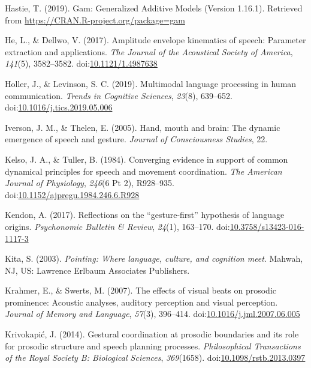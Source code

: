 \documentclass[
  man,floatsintext]{apa6}
\newlength{\cslhangindent}
\newenvironment{cslreferences}%
  {\setlength{\parindent}{0pt}%
  \everypar{\setlength{\hangindent}{\cslhangindent}}\ignorespaces}%
  {\par}
\begin{document}
\begin{cslreferences}
\leavevmode\hypertarget{ref-hastieGamGeneralizedAdditive2019}{}%
Hastie, T. (2019). Gam: Generalized Additive Models (Version 1.16.1). Retrieved from \url{https://CRAN.R-project.org/package=gam}

\leavevmode\hypertarget{ref-heAmplitudeEnvelopeKinematics2017a}{}%
He, L., \& Dellwo, V. (2017). Amplitude envelope kinematics of speech: Parameter extraction and applications. \emph{The Journal of the Acoustical Society of America}, \emph{141}(5), 3582--3582. doi:\href{https://doi.org/10.1121/1.4987638}{10.1121/1.4987638}

\leavevmode\hypertarget{ref-hollerMultimodalLanguageProcessing2019}{}%
Holler, J., \& Levinson, S. C. (2019). Multimodal language processing in human communication. \emph{Trends in Cognitive Sciences}, \emph{23}(8), 639--652. doi:\href{https://doi.org/10.1016/j.tics.2019.05.006}{10.1016/j.tics.2019.05.006}

\leavevmode\hypertarget{ref-iversonHandMouthBrain2005}{}%
Iverson, J. M., \& Thelen, E. (2005). Hand, mouth and brain: The dynamic emergence of speech and gesture. \emph{Journal of Consciousness Studies}, 22.

\leavevmode\hypertarget{ref-kelsoConvergingEvidenceSupport1984}{}%
Kelso, J. A., \& Tuller, B. (1984). Converging evidence in support of common dynamical principles for speech and movement coordination. \emph{The American Journal of Physiology}, \emph{246}(6 Pt 2), R928--935. doi:\href{https://doi.org/10.1152/ajpregu.1984.246.6.R928}{10.1152/ajpregu.1984.246.6.R928}

\leavevmode\hypertarget{ref-kendonReflectionsGesturefirstHypothesis2017}{}%
Kendon, A. (2017). Reflections on the ``gesture-first'' hypothesis of language origins. \emph{Psychonomic Bulletin \& Review}, \emph{24}(1), 163--170. doi:\href{https://doi.org/10.3758/s13423-016-1117-3}{10.3758/s13423-016-1117-3}

\leavevmode\hypertarget{ref-kitaPointingWhereLanguage2003}{}%
Kita, S. (2003). \emph{Pointing: Where language, culture, and cognition meet}. Mahwah, NJ, US: Lawrence Erlbaum Associates Publishers.

\leavevmode\hypertarget{ref-krahmerEffectsVisualBeats2007}{}%
Krahmer, E., \& Swerts, M. (2007). The effects of visual beats on prosodic prominence: Acoustic analyses, auditory perception and visual perception. \emph{Journal of Memory and Language}, \emph{57}(3), 396--414. doi:\href{https://doi.org/10.1016/j.jml.2007.06.005}{10.1016/j.jml.2007.06.005}

\leavevmode\hypertarget{ref-krivokapicGesturalCoordinationProsodic2014}{}%
Krivokapić, J. (2014). Gestural coordination at prosodic boundaries and its role for prosodic structure and speech planning processes. \emph{Philosophical Transactions of the Royal Society B: Biological Sciences}, \emph{369}(1658). doi:\href{https://doi.org/10.1098/rstb.2013.0397}{10.1098/rstb.2013.0397}


\end{cslreferences}
\end{document}
